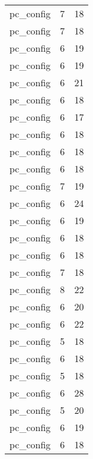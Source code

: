 \begin{table}
\begin{tabular}{lrr}
                       pc\_config &         7 &        18 \\
                       pc\_config &         7 &        18 \\
                       pc\_config &         6 &        19 \\
                       pc\_config &         6 &        19 \\
                       pc\_config &         6 &        21 \\
                       pc\_config &         6 &        18 \\
                       pc\_config &         6 &        17 \\
                       pc\_config &         6 &        18 \\
                       pc\_config &         6 &        18 \\
                       pc\_config &         6 &        18 \\
                       pc\_config &         7 &        19 \\
                       pc\_config &         6 &        24 \\
                       pc\_config &         6 &        19 \\
                       pc\_config &         6 &        18 \\
                       pc\_config &         6 &        18 \\
                       pc\_config &         7 &        18 \\
                       pc\_config &         8 &        22 \\
                       pc\_config &         6 &        20 \\
                       pc\_config &         6 &        22 \\
                       pc\_config &         5 &        18 \\
                       pc\_config &         6 &        18 \\
                       pc\_config &         5 &        18 \\
                       pc\_config &         6 &        28 \\
                       pc\_config &         5 &        20 \\
                       pc\_config &         6 &        19 \\
                       pc\_config &         6 &        18 \\

\end{tabular}
\end{table}
